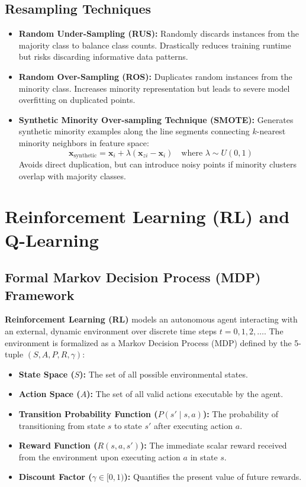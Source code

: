 \subsection{Resampling Techniques}
\begin{itemize}
    \item \textbf{Random Under-Sampling (RUS):} Randomly discards instances from the majority class to balance class counts. Drastically reduces training runtime but risks discarding informative data patterns.
    \item \textbf{Random Over-Sampling (ROS):} Duplicates random instances from the minority class. Increases minority representation but leads to severe model overfitting on duplicated points.
    \item \textbf{Synthetic Minority Over-sampling Technique (SMOTE):} Generates synthetic minority examples along the line segments connecting $k$-nearest minority neighbors in feature space:
    \begin{equation}
    \label{eq:smote_formula}
    \mathbf{x}_{\text{synthetic}} = \mathbf{x}_i + \lambda (\mathbf{x}_{zi} - \mathbf{x}_i) \quad \text{where } \lambda \sim U(0, 1)
    \end{equation}
    Avoids direct duplication, but can introduce noisy points if minority clusters overlap with majority classes.
\end{itemize}



\section{Reinforcement Learning (RL) and Q-Learning}
\label{sec:reinforcement_learning}

\subsection{Formal Markov Decision Process (MDP) Framework}
\textbf{Reinforcement Learning (RL)} models an autonomous agent interacting with an external, dynamic environment over discrete time steps $t = 0, 1, 2, \dots$. The environment is formalized as a Markov Decision Process (MDP) defined by the 5-tuple $(S, A, P, R, \gamma)$:
\begin{itemize}
    \item \textbf{State Space ($S$):} The set of all possible environmental states.
    \item \textbf{Action Space ($A$):} The set of all valid actions executable by the agent.
    \item \textbf{Transition Probability Function ($P(s' \mid s, a)$):} The probability of transitioning from state $s$ to state $s'$ after executing action $a$.
    \item \textbf{Reward Function ($R(s, a, s')$):} The immediate scalar reward received from the environment upon executing action $a$ in state $s$.
    \item \textbf{Discount Factor ($\gamma \in [0, 1)$):} Quantifies the present value of future rewards.
\end{itemize}

